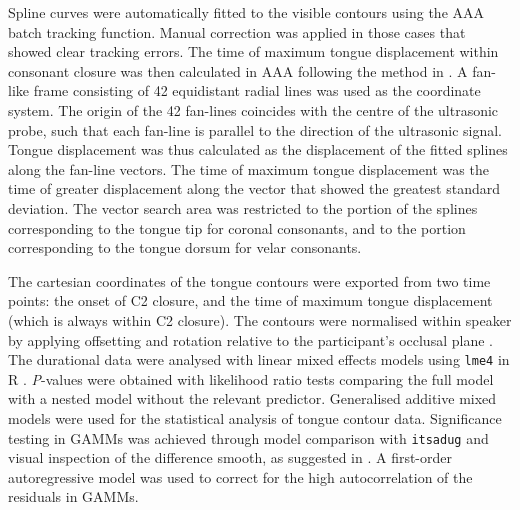 \documentclass[authoryear, 5p]{elsarticle}
\begin{document}

Spline curves were automatically fitted to the visible contours using
the AAA batch tracking function. Manual correction was applied in those
cases that showed clear tracking errors. The time of maximum tongue
displacement within consonant closure was then calculated in AAA
following the method in \citet{strycharczuk2015}. A fan-like frame
consisting of 42 equidistant radial lines was used as the coordinate
system. The origin of the 42 fan-lines coincides with the centre of the
ultrasonic probe, such that each fan-line is parallel to the direction
of the ultrasonic signal. Tongue displacement was thus calculated as the
displacement of the fitted splines along the fan-line vectors. The time
of maximum tongue displacement was the time of greater displacement
along the vector that showed the greatest standard deviation. The vector
search area was restricted to the portion of the splines corresponding
to the tongue tip for coronal consonants, and to the portion
corresponding to the tongue dorsum for velar consonants.

The cartesian coordinates of the tongue contours were exported from two
time points: the onset of C2 closure, and the time of maximum tongue
displacement (which is always within C2 closure). The contours were
normalised within speaker by applying offsetting and rotation relative
to the participant's occlusal plane \citep{scobbie2011}. The durational
data were analysed with linear mixed effects models using \texttt{lme4}
in R \citep{r-core-team2017, bates2015}. \emph{P}-values were obtained
with likelihood ratio tests comparing the full model with a nested model
without the relevant predictor. Generalised additive mixed models
\citep[GAMMs,][]{wood2006, zuur2012} were used for the statistical
analysis of tongue contour data. Significance testing in GAMMs was
achieved through model comparison with \texttt{itsadug}
\citep{van-rij2017} and visual inspection of the difference smooth, as
suggested in \citet{soskuthy2017}. A first-order autoregressive model
was used to correct for the high autocorrelation of the residuals in
GAMMs.
\end{document}
